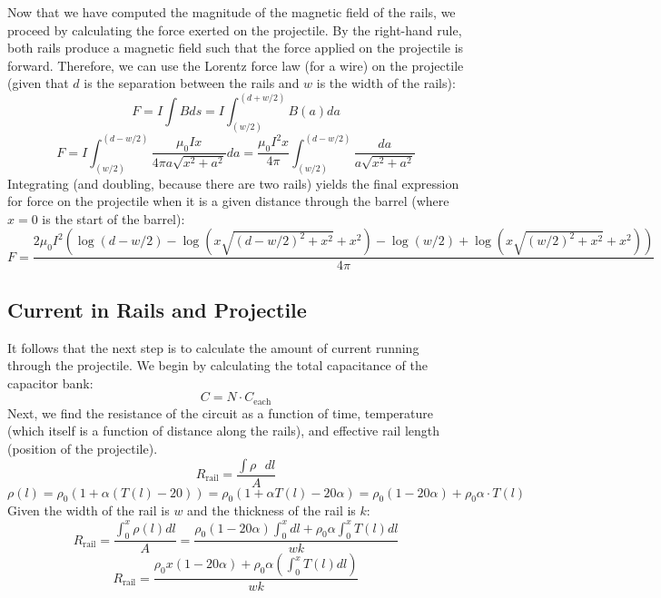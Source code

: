 \documentclass[12pt]{article}
\begin{document}
Now that we have computed the magnitude of the magnetic field of the rails, we proceed by calculating the force exerted on the projectile. By the right-hand rule, both rails produce a magnetic field such that the force applied on the projectile is forward. Therefore, we can use the Lorentz force law (for a wire) on the projectile (given that $d$ is the separation between the rails and $w$ is the width of the rails): 
\begin{equation}
    F = I \int B ds = I \int_{(w/2)}^{(d + w/2)} B(a) da
\end{equation}
\begin{equation}
    F = I \int_{(w/2)}^{(d - w/2)} \frac{\mu_0 I x}{4\pi a \sqrt{x^2 + a^2}} da = 
    \frac{\mu_0 I^2 x}{4\pi} \int_{(w/2)}^{(d - w/2)} \frac{da}{a \sqrt{x^2 + a^2}}
\end{equation}
Integrating (and doubling, because there are two rails) yields the final expression for force on the projectile when it is a given distance through the barrel (where $x = 0$ is the start of the barrel):
\begin{equation}
    F =
    \frac{2\mu_0 I^2 (\log(d - w/2) - \log(x\sqrt{(d - w/2)^2 + x^2} + x^2) - \log(w/2) + \log(x\sqrt{(w/2)^2 + x^2} + x^2))}{4\pi}
    \label{eqn:eqn1}
\end{equation}

\subsection{Current in Rails and Projectile}
It follows that the next step is to calculate the amount of current running through the projectile. We begin by calculating the total capacitance of the capacitor bank:
\begin{equation}
    C = N \cdot C_{\text{each}}
\end{equation}
Next, we find the resistance of the circuit as a function of time, temperature (which itself is a function of distance along the rails), and effective rail length (position of the projectile).
\begin{equation}
R_{\text{rail}} = \frac{\int\rho\text{ }dl}{A}
\end{equation}
\begin{equation}
\rho(l) = \rho_{0}(1 + \alpha (T(l) - 20)) = \rho_{0}(1 + \alpha T(l) - 20\alpha) = \rho_{0}(1 - 20\alpha) + \rho_{0}\alpha \cdot T(l)
\end{equation}
Given the width of the rail is $w$ and the thickness of the rail is $k$:
\begin{equation}
R_{\text{rail}} = \frac{\int_{0}^{x} \rho(l) dl}{A} = \frac{\rho_{0}(1 - 20\alpha) \int_{0}^{x} dl + \rho_{0}\alpha \int_{0}^{x} T(l) dl}{wk}
\end{equation}
\begin{equation}
R_{\text{rail}} = \frac{\rho_{0}x(1 - 20\alpha) + \rho_{0}\alpha (\int_{0}^{x} T(l) dl)}{wk}
\label{eqn:eqn2}
\end{equation}
\end{document}
